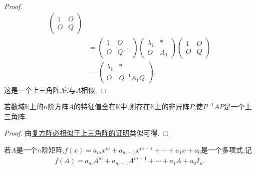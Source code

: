\documentclass[lang=cn,newtx,10pt,scheme=chinese]{elegantbook}
\begin{document}
\begin{proof}
\begin{align*}
\begin{pmatrix}
1 & O \\
O & Q
\end{pmatrix} \\
&= \begin{pmatrix}
1 & O \\
O & Q^{-1}
\end{pmatrix} \begin{pmatrix}
\lambda_1 & * \\
O & A_1
\end{pmatrix} \begin{pmatrix}
1 & O \\
O & Q
\end{pmatrix} \\
&= \begin{pmatrix}
\lambda_1 & * \\
O & Q^{-1}A_1Q
\end{pmatrix}.
\end{align*}
这是一个上三角阵,它与$A$相似.
\end{proof}

\begin{corollary}\label{corollary:特征值全在矩阵元素的数域中则一定相似于上三角阵}
若数域$\mathbb{K}$上的$n$阶方阵$A$的特征值全在$\mathbb{K}$中,则存在$\mathbb{K}$上的非异阵$P$,使$P^{-1}AP$是一个上三角阵.
\end{corollary}
\begin{proof}
由\hyperref[theorem:复方阵必相似于上三角阵]{复方阵必相似于上三角阵的证明}类似可得.
\end{proof}

\begin{definition}[矩阵多项式]
若$A$是一个$n$阶矩阵,$f(x) = a_m x^m + a_{m-1} x^{m-1} + \cdots + a_1 x + a_0$是一个多项式,记
\begin{align*}
f(A) = a_m A^m + a_{m-1} A^{m-1} + \cdots + a_1 A + a_0 I_n.
\end{align*}
\end{definition}
\end{document}
